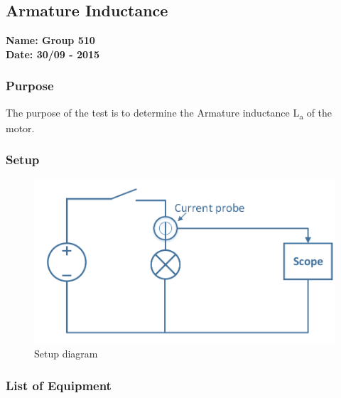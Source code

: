 \pagebreak
\subsection{Armature Inductance}%
\textbf{Name: Group 510}\\
\textbf{Date: 30/09 - 2015}

\subsubsection{Purpose}
The purpose of the test is to determine the Armature inductance \si{L_a} of the motor.

\subsubsection{Setup}
\begin{figure}[H]
  \centering
	\includegraphics[scale=0.5]{figures/MotorTest2.pdf}
	\caption{Setup diagram}
\end{figure}

\subsubsection{List of Equipment}

